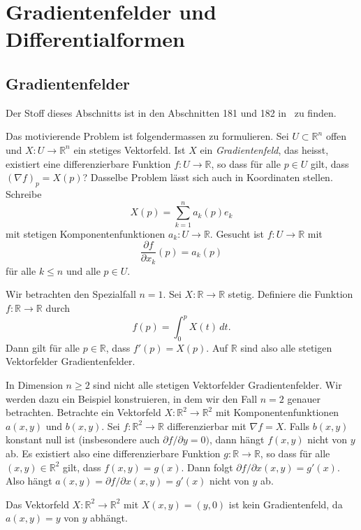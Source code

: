 \documentclass[../main.tex]{subfiles}
\begin{document}
\chapter{Gradientenfelder und Differentialformen}\label{chp:gradients}
\section{Gradientenfelder}
Der Stoff dieses Abschnitts ist in den
Abschnitten 181 und 182 in~\cite{heuser} zu finden.

Das motivierende Problem ist folgendermassen zu formulieren.
Sei $U \subset \mathbb{R}^n$ offen und
$X \colon U \to \mathbb{R}^n$ ein stetiges Vektorfeld.
Ist $X$ ein \emph{Gradientenfeld}, das heisst,
existiert
eine differenzierbare Funktion
$f \colon U \to \mathbb{R}$,
so dass für alle $p \in U$ gilt, dass ${(\nabla f)}_p = X(p)$?
Dasselbe Problem lässt sich auch in Koordinaten stellen.
Schreibe
\[
  X(p) = \sum_{k=1}^{n} a_k(p) e_k
\]
mit stetigen Komponentenfunktionen $a_k \colon U \to \mathbb{R}$.
Gesucht ist $f \colon U \to \mathbb{R}$ mit
\[
  \frac{\partial f}{\partial x_k} (p) = a_k(p)
\]
für alle
$k \leq n$ und alle $p \in U$.

\begin{specialcase}
  Wir betrachten den Spezialfall $n = 1$.
  Sei $X \colon \mathbb{R} \to \mathbb{R}$ stetig.
  Definiere die Funktion
  $f \colon \mathbb{R} \to \mathbb{R}$ 
  durch 
  \[
    f(p) = \int_{0}^{p} X(t) \, dt.
  \]
  Dann gilt für alle $p \in \mathbb{R}$,
  dass $f'(p) = X(p)$.
  Auf $\mathbb{R}$ sind also alle stetigen Vektorfelder Gradientenfelder.
\end{specialcase}

In Dimension $n \geq 2$ sind nicht alle stetigen
Vektorfelder Gradientenfelder.
Wir werden dazu ein Beispiel konstruieren, in dem wir
den Fall $n = 2$ genauer betrachten.
Betrachte ein Vektorfeld $X \colon \mathbb{R}^2 \to \mathbb{R}^2$
mit Komponentenfunktionen $a(x, y)$ und $b(x, y)$.
Sei $f \colon \mathbb{R}^2 \to \mathbb{R}$ differenzierbar
mit $\nabla f = X$.
Falls $b(x, y)$ konstant null ist (insbesondere auch
$\partial f / \partial y = 0)$, dann hängt
$f(x, y)$ nicht von $y$ ab.
Es existiert also eine
differenzierbare Funktion
$g \colon \mathbb{R} \to \mathbb{R}$,
so dass für alle $(x, y) \in \mathbb{R}^2$ gilt,
dass $f(x, y) = g(x)$.
Dann folgt $\partial f / \partial x (x, y) = g'(x)$.
Also hängt $a(x, y) = \partial f / \partial x(x, y) = g'(x)$
nicht von $y$ ab.

\begin{example}
  Das Vektorfeld $X \colon \mathbb{R}^2 \to \mathbb{R}^2$ 
  mit $X(x, y) = (y, 0)$ ist kein Gradientenfeld,
  da $a(x, y) = y$ von $y$ abhängt.
\end{example}
\end{document}
